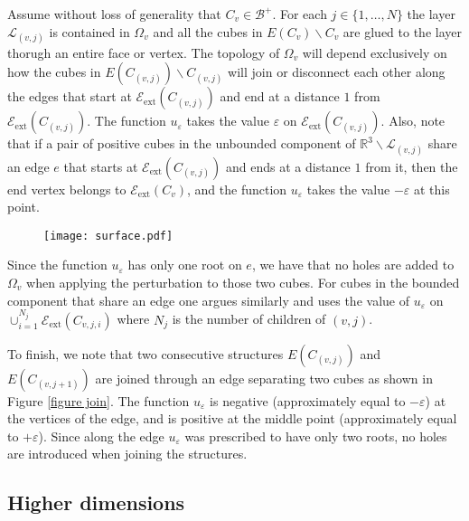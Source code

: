 \documentclass[11pt,reqno]{amsart}
\newcommand{\R}{{\mathbb R}}
\newcommand{\ep}{\varepsilon}
\theoremstyle{definition}
\begin{document}
   Assume without loss of generality that   $C_v \in \mathcal B^+$. 
  For each $j \in \{1, \dots, N\}$ the layer $\mathcal L_{(v,j)}$ is contained in $\Omega_v$ and all the cubes in $E(C_v)\backslash C_v$ are glued to the layer thorugh an entire face or vertex. The topology of $\Omega_v$ will depend exclusively on how the cubes  in  $E(C_{(v,j)})\backslash C_{(v,j)}$  will join or disconnect each other along the edges that start at   $\mathcal E_{\text{ext}} (C_{(v,j)})$ and end at a distance $1$ from $\mathcal E_{\text{ext}} (C_{(v,j)})$.  
The function  $u_\ep$ takes the value $\ep$ on $\mathcal E_{\text{ext}} (C_{(v,j)})$. Also, note that if a pair of positive cubes in the unbounded component of  $\R^3 \backslash \mathcal L_{(v,j)}$ share an edge $e$ that starts at $ \mathcal E_{\text{ext}} (C_{(v,j)})$  and ends at a distance $1$ from it, then the end vertex belongs to $\mathcal E_{\text{ext}} (C_v)$, and the function $u_\ep$ takes the value $-\ep$ at this point. 
  \begin{figure}
\texttt{[image: surface.pdf]}
 \end{figure}
Since the function $u_\ep$ has only one root on $e$, we have that no holes are added to $\Omega_v$ when applying the perturbation to those two cubes.    For cubes in the bounded component that share an edge one argues similarly and uses the value of $u_\ep$ on $ \cup_{i=1}^{N_j}\mathcal E_{\text{ext}} (C_{v,j,i})$ where $N_j$ is the number of children of $(v,j)$.

 To finish, we note that two consecutive  structures  $E(C_{(v,j)})$ and  $E(C_{(v,j+1)})$ are joined through an edge separating two  cubes as shown in Figure \ref{figure join}.  The function $u_\ep$ is negative (approximately equal to  $-\ep$) at the vertices of the edge, and  is positive at the middle point  (approximately equal to  $+\ep$). Since along the edge $u_\ep$ was prescribed to have only two roots, no holes are introduced when joining the structures.

\subsection{Higher dimensions}\label{higher dimensions}
\end{document}
